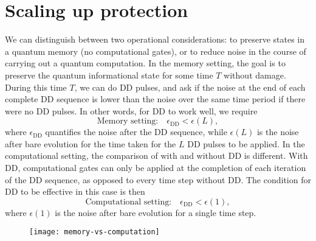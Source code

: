 \documentclass[b5paper,11pt]{article}
\begin{document}
\section{Scaling up protection}\label{sec:threshold}
We can distinguish between two operational considerations: to preserve states in a quantum memory (no computational gates), or to reduce noise in the course of carrying out a quantum computation. In the memory setting, the goal is to preserve the quantum informational state for some time $T$ without damage. During this time $T$, we can do DD pulses, and ask if the noise at the end of each complete DD sequence is lower than the noise over the same time period if there were no DD pulses. In other words, for DD to work well, we require
\begin{equation}
\textrm{Memory setting:}\quad \epsilon_\mathrm{DD}<\epsilon(L),
\end{equation}
where $\epsilon_\mathrm{DD}$ quantifies the noise after the DD sequence, while $\epsilon(L)$ is the noise after bare evolution for the time taken for the $L$ DD pulses to be applied.
In the computational setting, the comparison of with and without DD is different. With DD, computational gates can only be applied at the completion of each iteration of the DD sequence, as opposed to every time step without DD. The condition for DD to be effective in this case is then
\begin{equation}\label{eq:cond}
\textrm{Computational setting:}\quad\epsilon_\mathrm{DD}<\epsilon(1),
\end{equation}
where $\epsilon(1)$ is the noise after bare evolution for a single time step. 

\begin{figure}[htbp]
 \centering
 \texttt{[image: memory-vs-computation]}
 \caption{}
 \label{fig:memvscom}
\end{figure}
\end{document}

